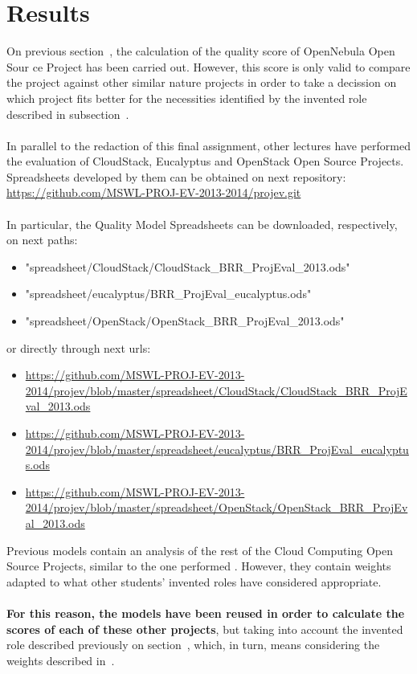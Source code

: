 \documentclass[11pt]{article}
\begin{document}
\section{Results} \label{sec:results}
On previous section~, the calculation of the quality score of OpenNebula Open Sour ce Project has been carried out. However, this score is only valid to compare the project against other similar nature projects in order to take a decission on which project fits better for the necessities identified by the invented role described in subsection~.\\
\\
In parallel to the redaction of this final assignment, other lectures have performed the evaluation of CloudStack, Eucalyptus and OpenStack Open Source Projects. Spreadsheets developed by them can be obtained on next repository:
\\
\url{https://github.com/MSWL-PROJ-EV-2013-2014/projev.git}\\
\\
In particular, the Quality Model Spreadsheets can be downloaded, respectively, on next paths:
\begin{itemize}\itemsep0pt
\item{"spreadsheet/CloudStack/CloudStack\_BRR\_ProjEval\_2013.ods"}
\item{"spreadsheet/eucalyptus/BRR\_ProjEval\_eucalyptus.ods"}
\item{"spreadsheet/OpenStack/OpenStack\_BRR\_ProjEval\_2013.ods"}
\end{itemize}
or directly through next urls:
\begin{itemize}\itemsep0pt
\item{\url{https://github.com/MSWL-PROJ-EV-2013-2014/projev/blob/master/spreadsheet/CloudStack/CloudStack\_BRR\_ProjEval\_2013.ods}}
\item{\url{https://github.com/MSWL-PROJ-EV-2013-2014/projev/blob/master/spreadsheet/eucalyptus/BRR\_ProjEval\_eucalyptus.ods}}
\item{\url{https://github.com/MSWL-PROJ-EV-2013-2014/projev/blob/master/spreadsheet/OpenStack/OpenStack\_BRR\_ProjEval\_2013.ods}}
\end{itemize}
Previous models contain an analysis of the rest of the Cloud Computing Open Source Projects, similar to the one performed . However, they contain weights adapted to what other students' invented roles have considered appropriate.\\
\\
\textbf{For this reason, the models have been reused in order to calculate the scores of each of these other projects}, but taking into account the invented role described previously on section~, which, in turn, means considering the weights described in~.\\
\end{document}
